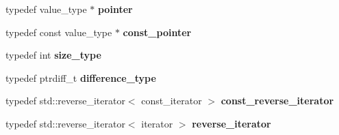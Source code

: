 \begin{DoxyCompactItemize}
\item 
\mbox{\label{classgoogle_1_1protobuf_1_1RepeatedField_af36876592ed70ee7459bc178f975665d}} 
typedef value\+\_\+type $\ast$ {\bfseries pointer}
\item 
\mbox{\label{classgoogle_1_1protobuf_1_1RepeatedField_a2e73ab7afa52dfd2249344006ea1be73}} 
typedef const value\+\_\+type $\ast$ {\bfseries const\+\_\+pointer}
\item 
\mbox{\label{classgoogle_1_1protobuf_1_1RepeatedField_aa09f6af062bf523ff6c93deee7d4b04e}} 
typedef int {\bfseries size\+\_\+type}
\item 
\mbox{\label{classgoogle_1_1protobuf_1_1RepeatedField_a23df2e891984dcec89eb18a2875defce}} 
typedef ptrdiff\+\_\+t {\bfseries difference\+\_\+type}
\item 
\mbox{\label{classgoogle_1_1protobuf_1_1RepeatedField_ac4359f48e29260cb4f89c68b7de0844b}} 
typedef std\+::reverse\+\_\+iterator$<$ const\+\_\+iterator $>$ {\bfseries const\+\_\+reverse\+\_\+iterator}
\item 
\mbox{\label{classgoogle_1_1protobuf_1_1RepeatedField_aaff815b4b8157d4763a818fdfa282907}} 
typedef std\+::reverse\+\_\+iterator$<$ iterator $>$ {\bfseries reverse\+\_\+iterator}
\end{DoxyCompactItemize}
